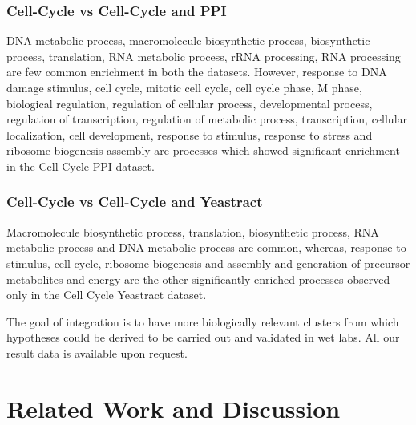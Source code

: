 \subsubsection{Cell-Cycle vs Cell-Cycle and PPI}
DNA metabolic process, macromolecule biosynthetic process, biosynthetic process, translation, RNA metabolic process, rRNA processing, 
RNA processing are few common enrichment in both the datasets. However, response to DNA damage stimulus, cell cycle, mitotic cell cycle, 
cell cycle phase, M phase, biological regulation, regulation of cellular process, developmental process, regulation of transcription, 
regulation of metabolic process, transcription, cellular localization, cell development, response to stimulus, response to 
stress and ribosome biogenesis assembly are processes which showed significant enrichment in the Cell Cycle PPI dataset.

\subsubsection{Cell-Cycle vs Cell-Cycle and Yeastract}
Macromolecule biosynthetic process, translation, biosynthetic process, RNA metabolic process and DNA metabolic process are common, 
whereas, response to stimulus, cell cycle, ribosome biogenesis and assembly and generation of precursor metabolites and energy are the other 
significantly enriched processes observed only in the Cell Cycle Yeastract dataset.

The goal of integration is to have more biologically relevant clusters from which hypotheses could be derived to be carried out and validated in wet labs. All our result data is available upon request. 

\section{Related Work and Discussion}


